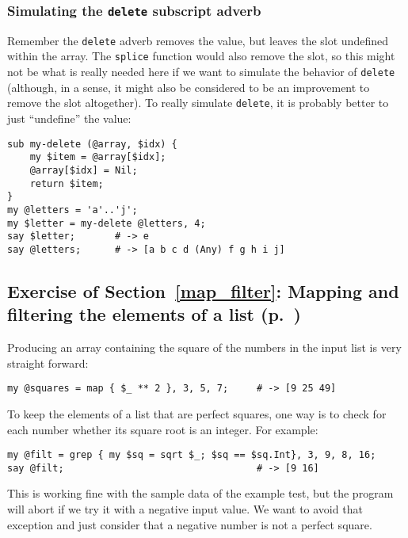 \subsubsection{Simulating the {\tt delete} subscript adverb}

Remember the {\tt delete} adverb removes the value, but 
leaves the slot undefined within the array. The {\tt splice} 
function would also remove the slot, so this might not be 
what is really needed here if we want to simulate the 
behavior of {\tt delete} (although, in a sense, it might 
also be considered to be an improvement to remove the slot
altogether). To really simulate {\tt delete}, it is probably 
better to just ``undefine'' the value:

\begin{verbatim}
sub my-delete (@array, $idx) {
    my $item = @array[$idx];
    @array[$idx] = Nil;
    return $item;
}
my @letters = 'a'..'j';
my $letter = my-delete @letters, 4;
say $letter;       # -> e
say @letters;      # -> [a b c d (Any) f g h i j]
\end{verbatim}

\subsection{Exercise of Section~\ref{map_filter}: Mapping and filtering the elements of a list (p.~\pageref{exercise_squares})}
\label{sol_exercise_squares}

Producing an array containing the square of the numbers in the input list is very straight forward:

\begin{verbatim}
my @squares = map { $_ ** 2 }, 3, 5, 7;     # -> [9 25 49]
\end{verbatim}
%

To keep the elements of a list that are perfect squares, one 
way is to check for each number whether its square root 
is an integer. For example:

\begin{verbatim}
my @filt = grep { my $sq = sqrt $_; $sq == $sq.Int}, 3, 9, 8, 16;
say @filt;                                  # -> [9 16]
\end{verbatim}
%

This is working fine with the sample data of the example test, 
but the program will abort if we try it with a negative input 
value. We want to avoid that exception and just 
consider that a negative number is not a perfect square.

